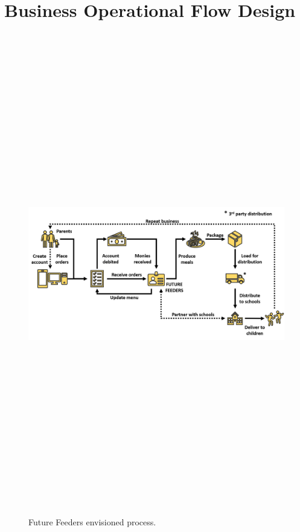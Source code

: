 \section{Business Operational Flow Design}
\label{app:process}

\begin{figure}[H]
    \centering
    \includegraphics[angle=90, height=21cm]{op_process.png}
    \caption{Future Feeders envisioned process.}
    \label{fig:op_process}
\end{figure}

